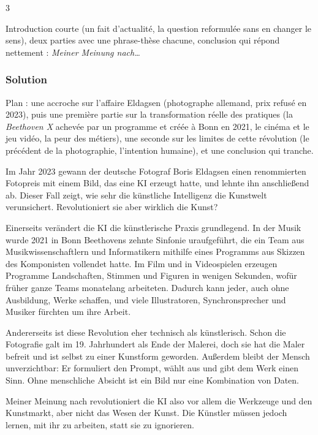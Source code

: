 \documentclass[11pt,a4paper]{article}
\begin{document}
\begin{indication}{3}

Introduction courte (un fait d'actualité, la question reformulée sans en changer le sens), deux parties avec une phrase-thèse chacune, conclusion qui répond nettement : \emph{Meiner Meinung nach\ldots{}}

\end{indication}

\hypertarget{solution-1}{%
\subsubsection{Solution}\label{solution-1}}

Plan : une accroche sur l'affaire Eldagsen (photographe allemand, prix refusé en 2023), puis une première partie sur la transformation réelle des pratiques (la \emph{Beethoven X} achevée par un programme et créée à Bonn en 2021, le cinéma et le jeu vidéo, la peur des métiers), une seconde sur les limites de cette révolution (le précédent de la photographie, l'intention humaine), et une conclusion qui tranche.

Im Jahr 2023 gewann der deutsche Fotograf Boris Eldagsen einen renommierten Fotopreis mit einem Bild, das eine KI erzeugt hatte, und lehnte ihn anschließend ab. Dieser Fall zeigt, wie sehr die künstliche Intelligenz die Kunstwelt verunsichert. Revolutioniert sie aber wirklich die Kunst?

Einerseits verändert die KI die künstlerische Praxis grundlegend. In der Musik wurde 2021 in Bonn Beethovens zehnte Sinfonie uraufgeführt, die ein Team aus Musikwissenschaftlern und Informatikern mithilfe eines Programms aus Skizzen des Komponisten vollendet hatte. Im Film und in Videospielen erzeugen Programme Landschaften, Stimmen und Figuren in wenigen Sekunden, wofür früher ganze Teams monatelang arbeiteten. Dadurch kann jeder, auch ohne Ausbildung, Werke schaffen, und viele Illustratoren, Synchronsprecher und Musiker fürchten um ihre Arbeit.

Andererseits ist diese Revolution eher technisch als künstlerisch. Schon die Fotografie galt im 19. Jahrhundert als Ende der Malerei, doch sie hat die Maler befreit und ist selbst zu einer Kunstform geworden. Außerdem bleibt der Mensch unverzichtbar: Er formuliert den Prompt, wählt aus und gibt dem Werk einen Sinn. Ohne menschliche Absicht ist ein Bild nur eine Kombination von Daten.

Meiner Meinung nach revolutioniert die KI also vor allem die Werkzeuge und den Kunstmarkt, aber nicht das Wesen der Kunst. Die Künstler müssen jedoch lernen, mit ihr zu arbeiten, statt sie zu ignorieren.
\end{document}
